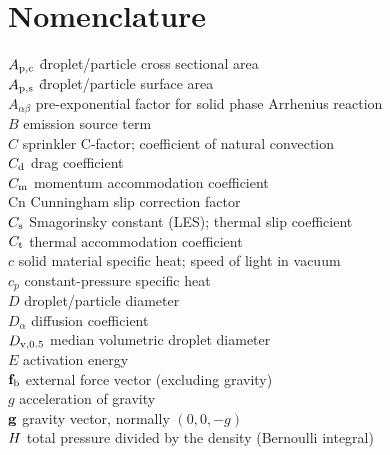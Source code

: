 

\chapter{Nomenclature}
\label{nomenclature}

\begin{tabbing}
$A_{\rm p,c}$ \hspace{1in}\= droplet/particle cross sectional area \\
$A_{\rm p,s}$ \hspace{1in}\= droplet/particle surface area \\
$A_{\alpha\beta}$         \> pre-exponential factor for solid phase Arrhenius reaction \\
$B$                       \> emission source term \\
$C$                       \> sprinkler C-factor; coefficient of natural convection \\
$C_{\rm d}$               \> drag coefficient \\
$C_{\rm m}$               \> momentum accommodation coefficient \\
Cn                        \> Cunningham slip correction factor \\
$C_{\rm s}$               \> Smagorinsky constant (LES); thermal slip coefficient  \\
$C_{\rm t}$               \> thermal accommodation coefficient \\
$c$                       \> solid material specific heat; speed of light in vacuum \\
$c_p$                     \> constant-pressure specific heat \\
$D$                       \> droplet/particle diameter   \\
$D_{\alpha}$              \> diffusion coefficient \\
$D_{\rm v,0.5}$           \> median volumetric droplet diameter \\
$E$                       \> activation energy \\
${\mathbf{f}}_{\rm b}$            \> external force vector (excluding gravity) \\
$g$                       \> acceleration of gravity \\
${\mathbf{g}}$                     \> gravity vector, normally $(0,0,-g)$ \\
$H$                      \> total pressure divided by the density (Bernoulli integral)\\

\end{tabbing}
